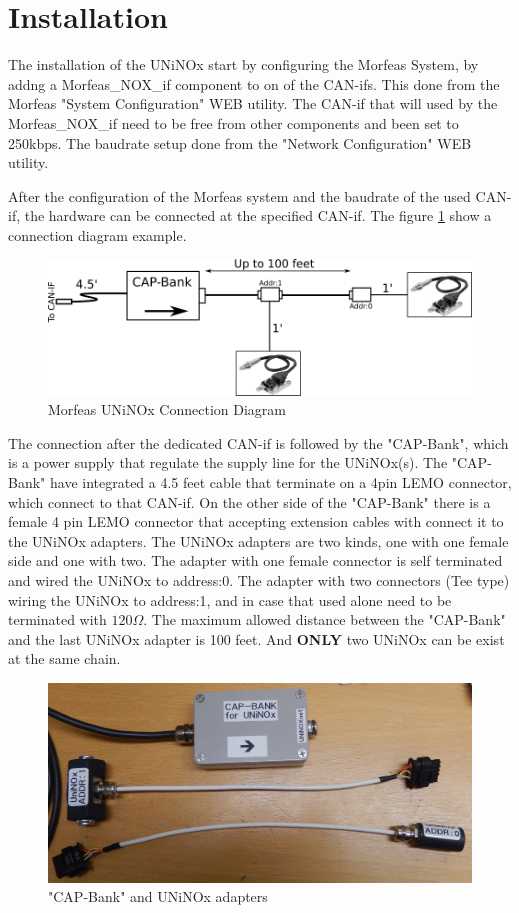 \section{Installation}
The installation of the UNiNOx start by configuring the Morfeas System, by addng a Morfeas\_NOX\_if component to on of the CAN-ifs.
This done from the Morfeas "System Configuration" WEB utility.
The CAN-if that will used by the Morfeas\_NOX\_if need to be free from other components and been set to 250kbps.
The baudrate setup done from the "Network Configuration" WEB utility.

After the configuration of the Morfeas system and the baudrate of the used CAN-if, the hardware can be connected at the specified CAN-if.
The figure \ref{fig:NOX_conn} show a connection diagram example.

\begin{figure}[h]
\centering
	\includegraphics[width=5in,angle=0]{../art/Morfeas_web_if/connection_diagram.png}
	\caption{Morfeas UNiNOx Connection Diagram}
	\label{fig:NOX_conn}
\end{figure}

The connection after the dedicated CAN-if is followed by the "CAP-Bank",
which is a power supply that regulate the supply line for the UNiNOx(s).
The "CAP-Bank" have integrated a 4.5 feet cable that terminate on a 4pin LEMO connector, which connect to that CAN-if.
On the other side of the "CAP-Bank" there is a female 4 pin LEMO connector that accepting extension cables with connect it to
the UNiNOx adapters. The UNiNOx adapters are two kinds, one with one female side and one with two.
The adapter with one female connector is self terminated and wired the UNiNOx to address:0.
The adapter with two connectors (Tee type) wiring the UNiNOx to address:1, and in case that used alone need to be terminated with $120\Omega$.
The maximum allowed distance between the "CAP-Bank" and the last UNiNOx adapter is 100 feet. 
And \textbf{ONLY} two UNiNOx can be exist at the same chain.

\begin{figure}[h]
\centering
	\includegraphics[width=5in,angle=0]{../art/Morfeas_web_if/UniNOx_adapters.png}
	\caption{"CAP-Bank" and UNiNOx adapters}
\end{figure}
